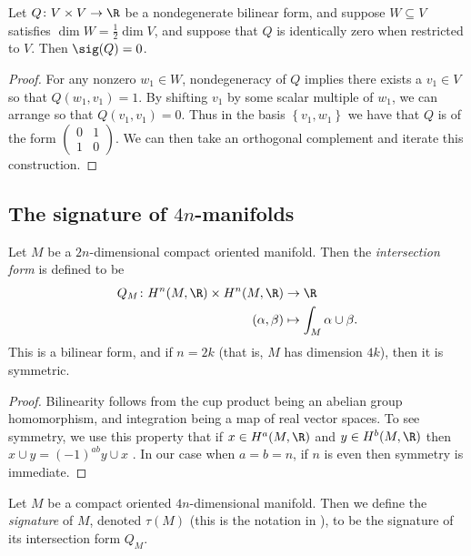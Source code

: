 \documentclass[11pt]{book}
\begin{document}
\begin{proposition}
\label{prop:sig-zero-if-half-dim-isotropic-subspace}
Let $Q \colon V \times V\to \R$ be a nondegenerate bilinear form, and suppose $W \subseteq V$ satisfies $\dim W = \frac{1}{2}\dim V$, and suppose that $Q$ is identically zero when restricted to $V$. Then $\sig(Q) = 0$.
\end{proposition}
\begin{proof} For any nonzero $w_1\in W$, nondegeneracy of $Q$ implies there exists a $v_1\in V$ so that $Q(w_1,v_1) =1$. By shifting $v_1$ by some scalar multiple of $w_1$, we can arrange so that $Q(v_1,v_1) = 0$. Thus in the basis $\left\{ v_1,w_1 \right\}$ we have that $Q$ is of the form $\begin{pmatrix} 0 & 1 \\ 1 & 0 \end{pmatrix}$. We can then take an orthogonal complement and iterate this construction.
\end{proof}




\subsection{The signature of $4n$-manifolds}


\begin{proposition} Let $M$ be a $2n$-dimensional compact oriented manifold. Then the \emph{intersection form} is defined to be
\begin{align*}
    Q_M \colon H^n(M,\R) \times H^n(M,\R) &\to \R \\
    (\alpha,\beta) &\mapsto \int_M \alpha \cup \beta.
\end{align*}
This is a bilinear form, and if $n=2k$ (that is, $M$ has dimension $4k$), then it is symmetric.
\end{proposition}
\begin{proof} Bilinearity follows from the cup product being an abelian group homomorphism, and integration being a map of real vector spaces. To see symmetry, we use this property that if $x\in H^a(M,\R)$ and $y\in H^b(M,\R)$ then $x\cup y = (-1)^{ab} y \cup x$ \cite[3.11]{Hatcher}. In our case when $a=b=n$, if $n$ is even then symmetry is immediate.
\end{proof}


\begin{definition}\label{def:signature-of-manifold} Let $M$ be a compact oriented $4n$-dimensional manifold. Then we define the \emph{signature} of $M$, denoted $\tau(M)$ (this is the notation in \cite{Hirzebruch}), to be the signature of its intersection form $Q_M$.
\end{definition}
\end{document}
